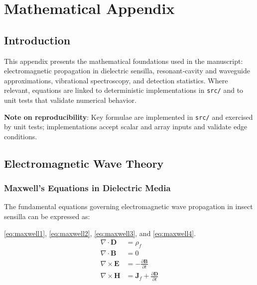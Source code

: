 \documentclass[
  13pt,
  a4paperpaper,
  12pt]{article}
\author{}
\date{}
\newcommand{\passthrough}[1]{#1}
\let\oldsection\section
\renewcommand{\section}{\clearpage\oldsection}
\begin{document}
{
\hypersetup{linkcolor=black}
\setcounter{tocdepth}{3}
\tableofcontents
}
\section{Mathematical Appendix}\label{sec:mathematical_appendix}

\subsection{Introduction}\label{introduction}

This appendix presents the mathematical foundations used in the
manuscript: electromagnetic propagation in dielectric sensilla,
resonant‑cavity and waveguide approximations, vibrational spectroscopy,
and detection statistics. Where relevant, equations are linked to
deterministic implementations in \passthrough{\lstinline!src/!} and to
unit tests that validate numerical behavior.

\textbf{Note on reproducibility}: Key formulae are implemented in
\passthrough{\lstinline!src/!} and exercised by unit tests;
implementations accept scalar and array inputs and validate edge
conditions.

\subsection{Electromagnetic Wave
Theory}\label{electromagnetic-wave-theory}

\subsubsection{Maxwell's Equations in Dielectric
Media}\label{maxwells-equations-in-dielectric-media}

The fundamental equations governing electromagnetic wave propagation in
insect sensilla can be expressed as:

\eqref{eq:maxwell1}, \eqref{eq:maxwell2}, \eqref{eq:maxwell3}, and
\eqref{eq:maxwell4}. \begin{align}
\nabla \cdot \mathbf{D} &= \rho_f \label{eq:maxwell1} \\
\nabla \cdot \mathbf{B} &= 0 \label{eq:maxwell2} \\
\nabla \times \mathbf{E} &= -\frac{\partial \mathbf{B}}{\partial t} \label{eq:maxwell3} \\
\nabla \times \mathbf{H} &= \mathbf{J}_f + \frac{\partial \mathbf{D}}{\partial t} \label{eq:maxwell4}
\end{align}
\end{document}
